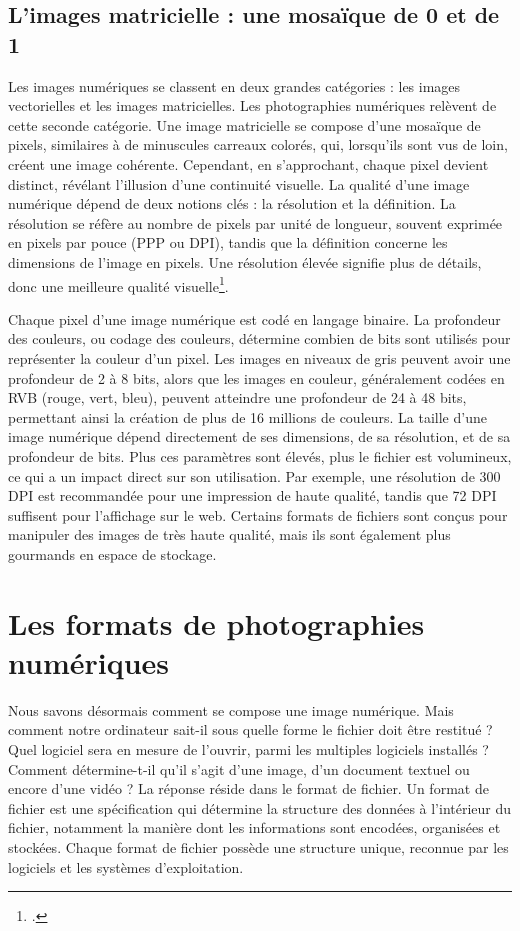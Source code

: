 \subsection*{L'images matricielle : une mosaïque de 0 et de 1}

Les images numériques se classent en deux grandes catégories : les images vectorielles et les images matricielles. Les photographies numériques relèvent de cette seconde catégorie. Une image matricielle se compose d'une mosaïque de pixels, similaires à de minuscules carreaux colorés, qui, lorsqu'ils sont vus de loin, créent une image cohérente. Cependant, en s'approchant, chaque pixel devient distinct, révélant l'illusion d'une continuité visuelle. La qualité d'une image numérique dépend de deux notions clés : la résolution et la définition. La résolution se réfère au nombre de pixels par unité de longueur, souvent exprimée en pixels par pouce (PPP ou DPI), tandis que la définition concerne les dimensions de l'image en pixels. Une résolution élevée signifie plus de détails, donc une meilleure qualité visuelle\footcite{clirDidacticielImagerieNumerique2000}.

Chaque pixel d'une image numérique est codé en langage binaire. La profondeur des couleurs, ou codage des couleurs, détermine combien de bits sont utilisés pour représenter la couleur d'un pixel. Les images en niveaux de gris peuvent avoir une profondeur de 2 à 8 bits, alors que les images en couleur, généralement codées en RVB (rouge, vert, bleu), peuvent atteindre une profondeur de 24 à 48 bits, permettant ainsi la création de plus de 16 millions de couleurs. La taille d'une image numérique dépend directement de ses dimensions, de sa résolution, et de sa profondeur de bits. Plus ces paramètres sont élevés, plus le fichier est volumineux, ce qui a un impact direct sur son utilisation. Par exemple, une résolution de 300 DPI est recommandée pour une impression de haute qualité, tandis que 72 DPI suffisent pour l'affichage sur le web. Certains formats de fichiers sont conçus pour manipuler des images de très haute qualité, mais ils sont également plus gourmands en espace de stockage.

\section{Les formats de photographies numériques}

Nous savons désormais comment se compose une image numérique. Mais comment notre ordinateur sait-il sous quelle forme le fichier doit être restitué ? Quel logiciel sera en mesure de l'ouvrir, parmi les multiples logiciels installés ? Comment détermine-t-il qu'il s'agit d'une image, d'un document textuel ou encore d'une vidéo ? La réponse réside dans le format de fichier. Un format de fichier est une spécification qui détermine la structure des données à l'intérieur du fichier, notamment la manière dont les informations sont encodées, organisées et stockées. Chaque format de fichier possède une structure unique, reconnue par les logiciels et les systèmes d'exploitation.

